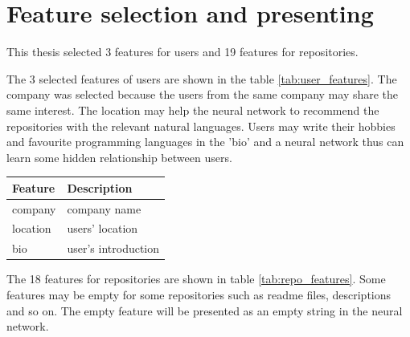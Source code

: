\documentclass[11pt,twoside]{report}
\begin{document}
\section{Feature selection and presenting}
This thesis selected 3 features for users and 19 features for repositories. 

The 3 selected features of users are shown in the table \ref{tab:user_features}. The company was selected because the users from the same company may share the same interest. The location may help the neural network to recommend the repositories with the relevant natural languages. Users may write their hobbies and favourite programming languages in the 'bio' and a neural network thus can learn some hidden relationship between users.

\begin{center}
    \begin{tabular}{| l | l |}
    \hline
    Feature & Description \\ \hline
    company & company name \\ \hline
    location & users' location \\ \hline
    bio & user's introduction \\ \hline
    \end{tabular}
    \label{tab:user_features}
\end{center}

The 18 features for repositories are shown in table \ref{tab:repo_features}. Some features may be empty for some repositories such as readme files, descriptions and so on. The empty feature will be presented as an empty string in the neural network.
\end{document}
